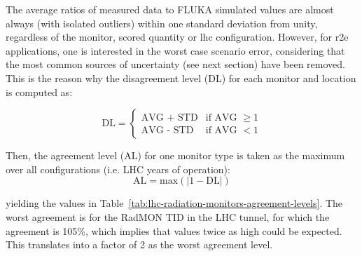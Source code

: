 \documentclass[encoding=utf8,british]{tumphthesis}
\begin{document}
The average ratios of measured data to FLUKA simulated values are almost always (with isolated outliers) within one standard deviation from unity, regardless of the monitor, scored quantity or \acrshort{lhc} configuration. However, for \acrshort{r2e} applications, one is interested in the worst case scenario error, considering that the most common sources of uncertainty (see next section) have been removed. This is the reason why the disagreement level (DL) for each monitor and location is computed as:

\begin{equation}
    \text{DL} = 
    \begin{cases}
        \text{AVG + STD} &\text{if AVG $\ge1$}\\
        \text{AVG - STD} &\text{if AVG $<1$}
    \end{cases}
\end{equation}

Then, the agreement level (AL) for one monitor type is taken as the maximum over all configurations (i.e. LHC years of operation):
\begin{equation}
\text{AL} = \text{max}( | 1 - \text{DL}|)
\end{equation}

yielding the values in Table~\ref{tab:lhc-radiation-monitors-agreement-levels}. The worst agreement is for the RadMON TID in the LHC tunnel, for which the agreement is 105\%, which implies that values twice as high could be expected. This translates into a factor of 2 as the worst agreement level.
\end{document}
